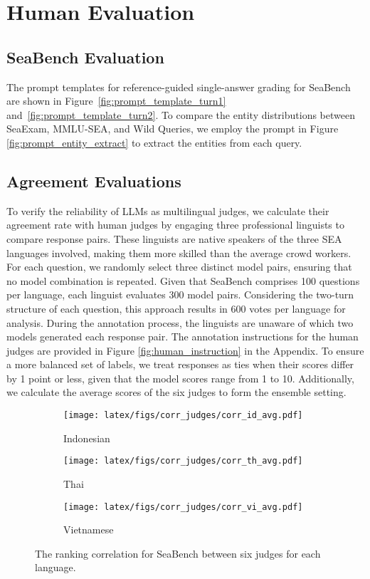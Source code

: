 \section{Human Evaluation}
\subsection{SeaBench Evaluation}
The prompt templates for reference-guided single-answer grading for SeaBench are shown in Figure~\ref{fig:prompt_template_turn1} and~\ref{fig:prompt_template_turn2}. To compare the entity distributions between SeaExam, MMLU-SEA, and Wild Queries, we employ the prompt in Figure \ref{fig:prompt_entity_extract} to extract the entities from each query. 


\subsection{Agreement Evaluations} \label{app:agreement}
To verify the reliability of LLMs as multilingual judges, we calculate their agreement rate with human judges by engaging three professional linguists to compare response pairs. These linguists are native speakers of the three SEA languages involved, making them more skilled than the average crowd workers. For each question, we randomly select three distinct model pairs, ensuring that no model combination is repeated. Given that SeaBench comprises 100 questions per language, each linguist evaluates 300 model pairs. Considering the two-turn structure of each question, this approach results in 600 votes per language for analysis. During the annotation process, the linguists are unaware of which two models generated each response pair. The annotation instructions for the human judges are provided in Figure \ref{fig:human_instruction} in the Appendix. To ensure a more balanced set of labels, we treat responses as ties when their scores differ by 1 point or less, given that the model scores range from 1 to 10. Additionally, we calculate the average scores of the six judges to form the ensemble setting.


\begin{figure*}[!ht]
    \centering
    \begin{subfigure}[b]{0.38\textwidth}
        \centering
        \texttt{[image: latex/figs/corr\_judges/corr\_id\_avg.pdf]}
        \caption{Indonesian}
        \label{fig:subfig1}
    \end{subfigure}
    \begin{subfigure}[b]{0.28\textwidth}
        \centering
        \texttt{[image: latex/figs/corr\_judges/corr\_th\_avg.pdf]}
        \caption{Thai}
        \label{fig:subfig2}
    \end{subfigure}
    \begin{subfigure}[b]{0.28\textwidth}
        \centering
        \texttt{[image: latex/figs/corr\_judges/corr\_vi\_avg.pdf]}
        \caption{Vietnamese}
        \label{fig:subfig3}
    \end{subfigure}


    \caption{The ranking correlation for SeaBench between six judges for each language.}
    \label{fig:corr_SeaBench_judge.}
\end{figure*}

